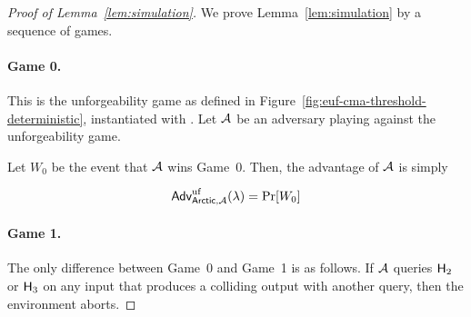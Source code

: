 

\begin{proof}[Proof of Lemma~\ref{lem:simulation}]
  We prove Lemma~\ref{lem:simulation} by a sequence of games.

  \paragraph{Game 0.}
  This is the unforgeability game as defined in
  Figure~\ref{fig:euf-cma-threshold-deterministic},
  instantiated with \glitter.
  Let $\mathcal{A}$ be an adversary playing against the unforgeability game.

  Let $W_0$ be the event that $\mathcal{A}$ wins Game~0.
  Then, the advantage of $\mathcal{A}$ is simply

  \begin{equation} \label{eq:game0}
    \textsf{\upshape Adv}^{\textrm{\upshape uf}}_{\mathsf{Arctic}, \mathcal{A}}(\lambda) = \Pr[W_0]
  \end{equation}

  \paragraph{Game 1.}
  The only difference between Game~0 and Game~1 is as follows.
  If $\mathcal{A}$ queries $\mathsf{H}_2$ or $\mathsf{H}_3$ on any input that produces a colliding output with another query,
  then the environment aborts.



\end{proof}
